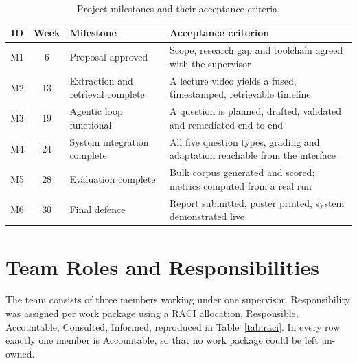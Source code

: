 \begin{table}[H]
\centering
\caption{Project milestones and their acceptance criteria.}
\label{tab:milestones}
\footnotesize
\begin{tabular}{|c|c|p{4.2cm}|p{5.4cm}|}
\hline
\textbf{ID} & \textbf{Week} & \textbf{Milestone} & \textbf{Acceptance criterion} \\
\hline
M1 & 6  & Proposal approved &
     Scope, research gap and toolchain agreed with the supervisor \\
M2 & 13 & Extraction and retrieval complete &
     A lecture video yields a fused, timestamped, retrievable timeline \\
M3 & 19 & Agentic loop functional &
     A question is planned, drafted, validated and remediated end to end \\
M4 & 24 & System integration complete &
     All five question types, grading and adaptation reachable from the interface \\
M5 & 28 & Evaluation complete &
     Bulk corpus generated and scored; metrics computed from a real run \\
M6 & 30 & Final defence &
     Report submitted, poster printed, system demonstrated live \\
\hline
\end{tabular}
\end{table}

\section{Team Roles and Responsibilities}
\label{sec:plan-raci}

The team consists of three members working under one supervisor.
Responsibility was assigned per work package using a RACI allocation,
Responsible, Accountable, Consulted, Informed, reproduced in
Table~\ref{tab:raci}. In every row exactly one member is Accountable, so that
no work package could be left un-owned.

